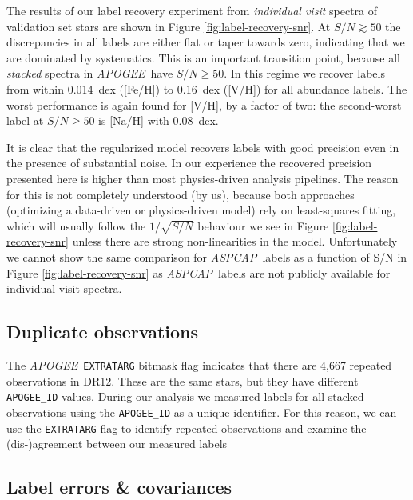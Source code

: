 \documentclass[12pt,preprint]{aastex}
\newcommand{\project}[1]{\textsl{#1}}
\newcommand{\acronym}[1]{{\small{#1}}}
\newcommand{\apogee}{\project{\acronym{APOGEE}}}
\newcommand{\aspcap}{\project{\acronym{ASPCAP}}}
\newcommand{\dr}{\acronym{DR12}}
\begin{document}
The results of our label recovery experiment from \emph{individual visit} spectra of
validation set stars are shown in Figure \ref{fig:label-recovery-snr}.  
At $S/N \gtrsim 50$ the discrepancies in all
labels are either flat or taper towards zero, indicating that we are dominated
by systematics.  This is an important transition point, because all 
\emph{stacked} spectra in \apogee\ have $S/N \geq 50$.  In this regime we 
recover labels from within 0.014~dex ([Fe/H]) to 0.16~dex ([V/H]) for all 
abundance labels.  The worst performance is again found for [V/H], by a factor of
two: the second-worst label at $S/N \geq 50$ is [Na/H] with 0.08~dex. 


It is clear that the regularized model recovers labels with good precision even
in the presence of substantial noise.  In our experience the recovered 
precision presented here is higher than most physics-driven analysis pipelines.  
The reason for this is not completely understood (by us), because both approaches 
(optimizing a data-driven or physics-driven model) rely on least-squares 
fitting, which will usually follow the $1/\sqrt{S/N}$ behaviour we see in Figure 
\ref{fig:label-recovery-snr} unless there are strong non-linearities in the model.
Unfortunately we cannot show the same comparison for \aspcap\ labels as a 
function of S/N in Figure \ref{fig:label-recovery-snr} as \aspcap\ labels are not
publicly available for individual visit spectra.


\subsection{Duplicate observations}
\label{sec:duplicate-observations}


The \apogee\ \texttt{EXTRATARG} bitmask flag indicates that there are 4,667
repeated observations in \dr.  These are the same stars, but they have different
\texttt{APOGEE\_ID} values.  During our analysis we measured labels for all
stacked observations using the \texttt{APOGEE\_ID} as a unique identifier.  For
this reason, we can use the \texttt{EXTRATARG} flag to identify repeated
observations and examine the (dis-)agreement between our measured labels



\subsection{Label errors \& covariances}
\label{sec:errors}
\end{document}
